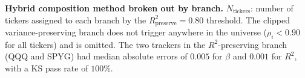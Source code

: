 
\begin{table}[H]
  \centering
  \caption{\textbf{Hybrid composition method broken out by branch.}
    $N_{\mathrm{tickers}}$: number of tickers assigned to each branch by
    the $R^2_{\mathrm{preserve}} = 0.80$ threshold. The clipped
    variance-preserving branch does not trigger anywhere in the
    universe ($\rho_i < 0.90$ for all tickers) and is omitted. The
    two trackers in the $R^2$-preserving branch (QQQ and SPYG) had
    median absolute errors of $0.005$ for $\beta$ and $0.001$ for
    $R^2$, with a KS pass rate of $100\%$.}
  \label{tab:branch}
  \small
  
\end{table}

